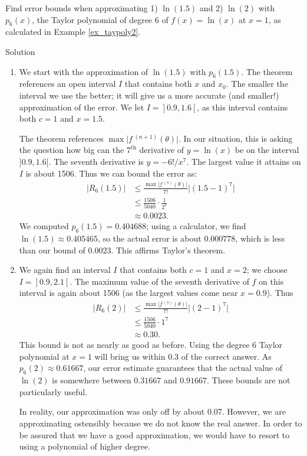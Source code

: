 \begin{example}\label{ex_taypoly3}
Find error bounds when approximating 1) $\ln(1.5)$ and 2) $\ln(2)$ with $p_6(x)$, the Taylor polynomial of degree 6 of $f(x)=\ln(x)$ at $x=1$, as calculated in Example \ref{ex_taypoly2}. 

\pagebreak
{}Solution 

\begin{enumerate}
\item	We start with the approximation of $\ln(1.5)$ with $p_6(1.5)$. The theorem references an open interval $I$ that contains both $x$ and $x_0$. The smaller the interval we use the better; it will give us a more accurate (and smaller!) approximation of the error. We let $I = \left.\right]0.9,1.6\left[\right.$, as this interval contains both $c=1$ and $x=1.5$. 

The theorem references $\max\big|f\,^{(n+1)}(\theta)\big|$. In our situation, this is asking the question how big can the $7^\text{th}$ derivative of $y=\ln(x)$ be on the interval $]0.9,1.6[$. The seventh derivative is $y = -6!/x^7$. The largest value it attains on $I$ is about 1506. Thus we can bound the error as:
\begin{align*}
\big|R_6(1.5)\big| &\leq \frac{\max\big|f\,^{(7)}(\theta)\big|}{7!}\big|(1.5-1)^7\big|\\
					&\leq \frac{1506}{5040}\cdot\frac1{2^7}\\
					&\approx 0.0023.
\end{align*}
\noindent%
We computed $p_6(1.5) = 0.404688$; using a calculator, we find $\ln(1.5) \approx 0.405465$, so the actual error is about $0.000778$, which is less than our bound of $0.0023$. This affirms Taylor's theorem.

\item		We again find an interval $I$ that contains both $c=1$ and $x=2$; we choose $I = \left.\right]0.9,2.1\left[\right.$. The maximum value of the seventh derivative of $f$ on this interval is again about 1506 (as the largest values come near $x=0.9$). Thus 
\begin{align*}
\big| R_6(2)\big| &\leq \frac{\max\big|f\,^{(7)}(\theta)\big|}{7!}\big|(2-1)^7\big|\\
					&\leq \frac{1506}{5040}\cdot1^7\\
					&\approx 0.30.
\end{align*}
This bound is not as nearly as good as before. Using the degree 6 Taylor polynomial at $x =1$ will bring us within 0.3 of the correct answer. As $p_6(2)\approx 0.61667$, our error estimate guarantees that the actual value of $\ln(2)$ is somewhere between $0.31667$ and $0.91667$. These bounds are not particularly useful.

In reality, our approximation was only off by about 0.07. However, we are approximating ostensibly because we do not know the real answer. In order to be assured that we have a good approximation, we would have to resort to using a polynomial of higher degree.
\end{enumerate}
\end{example}

